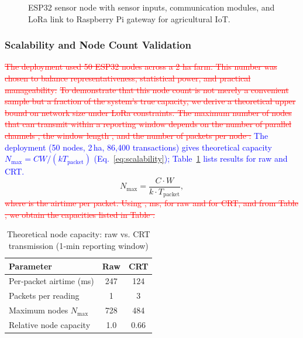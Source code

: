 \documentclass[pdflatex,sn-mathphys-num]{sn-jnl}
\theoremstyle{thmstyleone}
\theoremstyle{thmstyletwo}
\theoremstyle{thmstylethree}
\begin{document}
{\begin{figure}
{}%
  \caption{ESP32 sensor node with sensor inputs, communication modules, and LoRa link to Raspberry Pi gateway for agricultural IoT.}
  \label{fig:enhanced-sensor-node}
\end{figure}

\subsubsection{Scalability and Node Count Validation}
\label{subsubsec:scalability_analysis_related}

\textcolor{red}{\sout{The deployment used 50 ESP32 nodes across a 2 ha farm. This number was chosen to balance representativeness, statistical power, and practical manageability:}}
\textcolor{red}{\sout{To demonstrate that this node count is not merely a convenient sample but a fraction of the system’s true capacity, we derive a theoretical upper bound on network size under LoRa constraints. The maximum number of nodes that can transmit within a reporting window depends on the number of parallel channels , the window length , and the number of packets per node :}}
\textcolor{blue}{The deployment (50 nodes, 2\,ha, 86,400 transactions) gives theoretical capacity $N_{\max} = C W / (k T_{\text{packet}})$ (Eq.~\ref{eq:scalability}); Table~\ref{tab:scalability-comparison} lists results for raw and CRT.}
\begin{equation}
N_{\max} = \frac{C \cdot W}{k \cdot T_{\text{packet}}},
\label{eq:scalability}
\end{equation}
\textcolor{red}{\sout{where is the airtime per packet. Using , ms, for raw and for CRT, and from Table , we obtain the capacities listed in Table .}}

\begin{table}[htbp]
\centering
\caption{Theoretical node capacity: raw vs. CRT transmission (1‑min reporting window)}
\label{tab:scalability-comparison}
\begin{tabular}{lcc}
\toprule
\textbf{Parameter}                & \textbf{Raw} & \textbf{CRT} \\
\midrule
Per‑packet airtime (ms)           & 247           & 124           \\
Packets per reading               & 1             & 3             \\
Maximum nodes $N_{\max}$           & 728           & 484           \\
Relative node capacity             & 1.0           & 0.66          \\
\bottomrule
\end{tabular}
\end{table}

}
\end{document}
